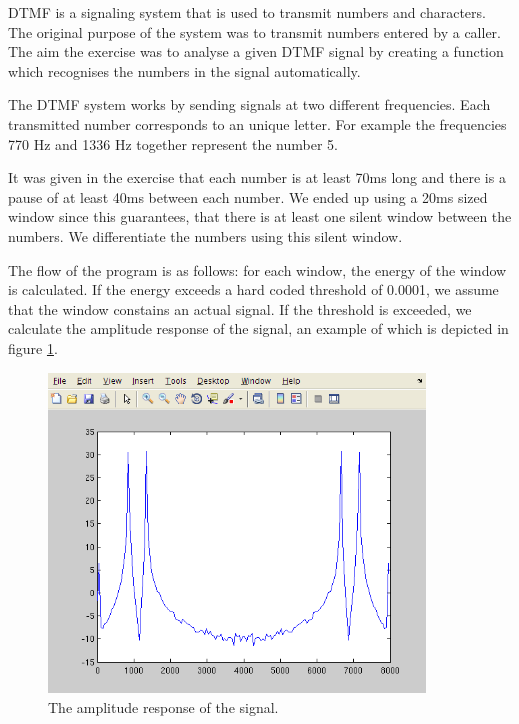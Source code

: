 DTMF is a signaling system that is used to
transmit numbers and characters. The original purpose of the system
was to transmit numbers entered by a caller.
The aim the exercise was to analyse a given DTMF signal by
creating a function which recognises the numbers in the signal
automatically.

The DTMF system works by sending signals at two different
frequencies. Each transmitted number corresponds to an unique
letter. For example the frequencies 770 Hz and 1336 Hz together
represent the number 5.

It was given in the exercise that each number is at least
70ms long and there is a pause of at least 40ms between each number. We
ended up using a 20ms sized window since this guarantees, that
there is at least one silent window between the numbers.
We differentiate the numbers using this silent window.

The flow of the program is as follows: for each window, the energy of the
window is calculated. If the energy exceeds a hard coded
threshold of 0.0001, we assume that the window constains an
actual signal. If the threshold is exceeded, we calculate
the amplitude response of the signal, an example of which is depicted in
figure \ref{fig:q2_amplitude_response}.


\begin{figure}[h!]
  \begin{center}
    \hspace*{-1in}
    \includegraphics[width=100mm]{Q2/magnitude_vs_freq.png}
    \caption{The amplitude response of the signal. 
      \label{fig:q2_amplitude_response}}
  \end{center}  
\end{figure}


